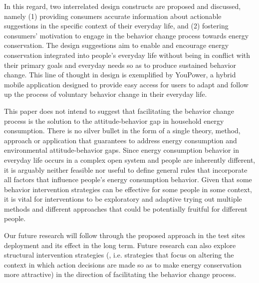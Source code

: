 \documentclass[a4paper]{article}
\begin{document}
In this regard, two interrelated design constructs are proposed and discussed, namely (1) providing consumers accurate information about actionable suggestions in the specific context of their everyday life, and (2) fostering consumers' motivation to engage in the behavior change process towards energy conservation. The design suggestions aim to enable and encourage energy conservation integrated into people's everyday life without being in conflict with their primary goals and everyday needs so as to produce sustained behavior change. This line of thought in design is exemplified by YouPower, a hybrid mobile application designed to provide easy access for users to adapt and follow up the process of voluntary behavior change in their everyday life.

This paper does not intend to suggest that facilitating the behavior change process is the solution to the attitude-behavior gap in household energy consumption. There is no silver bullet in the form of a single theory, method, approach or application that guarantees to address energy consumption and environmental attitude-behavior gaps. Since energy consumption behavior in everyday life occurs in a complex open system and people are inherently different, it is arguably neither feasible nor useful to define general rules that incorporate all factors that influence people's energy consumption behavior. Given that some behavior intervention strategies can be effective for some people in some context, it is vital for interventions to be exploratory and adaptive trying out multiple methods and different approaches that could be potentially fruitful for different people. 

Our future research will follow through the proposed approach in the test sites deployment and its effect in the long term. Future research can also explore structural intervention strategies (\cite{Steg2008}, i.e. strategies that focus on altering the context in which action decisions are made so as to make energy conservation more attractive) in the direction of facilitating the behavior change process. 

\printbibliography
\end{document}

